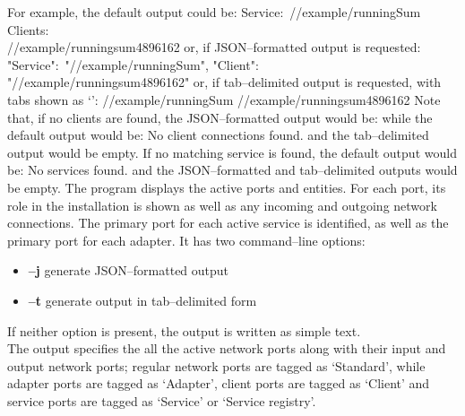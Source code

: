 For example, the default output could be:
\outputBegin{}
Service:\ /\serviceName/example/runningSum\\
\settowidth{\utilLen}{Service:\ }%
Clients:\\
\hspace*{\utilLen}/\clientName/example/runningsum\textunderscore{}4896162
\outputEnd{}
or, if JSON--formatted output is requested:
\outputBegin{}
\openSq{} \textbraceleft{} "Service":\ "/\serviceName/example/runningSum", "Client":\ \\
"/\clientName/example/runningsum\textunderscore{}4896162" \textbraceright{} \closeSq
\outputEnd{}
or, if tab--delimited output is requested, with tabs shown as
`\texttt{\boldmath{$\vdash$}}':
\outputBegin{}
/\serviceName/example/runningSum\pseudotab{}%
/\clientName/example/runningsum\textunderscore{}4896162
\outputEnd{}
Note that, if no clients are found, the JSON--formatted output would be:
\outputBegin{}
\sqPair
\outputEnd{}
while the default output would be:
\outputBegin{}
No client connections found.
\outputEnd{}
and the tab--delimited output would be empty.
If no matching service is found, the default output would be:
\outputBegin{}
No services found.
\outputEnd{}
and the JSON--formatted and tab--delimited outputs would be empty.
The program  displays the active \yarp{} ports and \mplusm{}
entities.
For each \yarp{} port, its role in the \mplusm{} installation is shown as well as any
incoming and outgoing \yarp{} network connections.
The primary port for each active service is identified, as well as the primary port for
each adapter.
It has two command--line options:
\begin{itemize}
\item \textbf{--j} generate JSON--formatted output
\item \textbf{--t} generate output in tab--delimited form
\end{itemize}
If neither option is present, the output is written as simple text.\\

The output specifies the all the active \yarp{} network ports along with their input and
output \yarp{} network ports; regular \yarp{} network ports are tagged as `Standard',
while \mplusm{} adapter ports are tagged as `Adapter', \mplusm{} client ports are tagged
as `Client' and \mplusm{} service ports are tagged as `Service' or `Service registry'.\\

